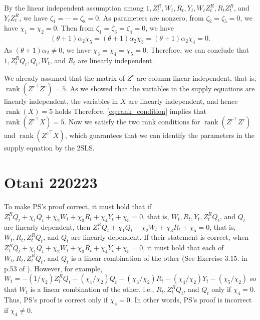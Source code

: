 \documentclass[11pt, a4paper]{article}
\DeclareMathOperator{\rank}{rank}
\begin{document}
By the linear independent assumption among $1, Z^R_t, W_t, R_t, Y_t, W_tZ^R_t, R_tZ^R_t$, and $Y_tZ^R_t$, we have $\zeta_1 = \cdots = \zeta_8 = 0$.
As parameters are nonzero, from $\zeta_2 = \zeta_5 = 0$, we have $\chi_1 = \chi_2 =0$.
Then from $\zeta_1 = \zeta_3 = \zeta_4 = 0$, we have 
\begin{align*}
    (\theta + 1 )\alpha_2\chi_5 = (\theta + 1 )\alpha_2\chi_3 = (\theta + 1 )\alpha_2\chi_4 = 0.
\end{align*}
As $(\theta + 1)\alpha_2 \ne 0$, we have $\chi_3 = \chi_4 = \chi_5 = 0$.
Therefore, we can conclude that $1, Z^R_{t}Q_{t}, Q_{t}, W_{t}$, and $ R_{t}$ are linearly independent.


We already assumed that the matrix of $Z^c$ are column linear independent, that is, $\rank({Z^c}^\top Z^c) = 5$.
As we showed that the variables in the supply equations are linearly independent, the variables in $X$ are linearly independent, and hence $\rank(X) = 5$ holds
Therefore, \eqref{eq:rank_condition} implies that $\rank({Z^c}^\top X) = 5$.
Now we satisfy the two rank conditions for $\rank({Z^c}^\top Z^c)$ and $\rank({Z^c}^\top X)$, which guarantees that we can identify the parameters in the supply equation by the 2SLS.


\section{Otani 220223}

To make PS's proof correct, it must hold that if $Z^{R}_{t} Q_{t} + \chi_1 Q_{t} + \chi_2 W_{t} + \chi_3 R_{t} + \chi_4 Y_{t} + \chi_5 = 0$, that is, $W_{t}, R_{t}, Y_{t}, Z^{R}_{t}Q_{t}$, and $Q_{t}$ are linearly dependent, then $Z^{R}_{t} Q_{t} + \chi_1 Q_{t} + \chi_2 W_{t} + \chi_3 R_{t} + \chi_5 = 0$, that is, $W_{t}, R_{t}, Z^{R}_{t}Q_{t}$, and $Q_{t}$ are linearly dependent. If their statement is correct, when $Z^{R}_{t} Q_{t} + \chi_1 Q_{t} + \chi_2 W_{t} + \chi_3 R_{t} + \chi_4 Y_{t} + \chi_5 = 0$, it must hold that each of $W_{t}, R_{t}, Z^{R}_{t}Q_{t}$, and $Q_{t}$ is a linear combination of the other (See Exercise 3.15. in p.53 of \cite{abadir2005matrix}). However, for example, $W_{t}=-(1/\chi_2) Z^{R}_{t} Q_{t} - (\chi_1/\chi_2)  Q_{t} - (\chi_3/\chi_2) R_{t} - (\chi_4/\chi_2) Y_{t} - (\chi_5/\chi_2)$ so that $W_{t}$ is a linear combination of the other, i.e., $R_{t}, Z^{R}_{t}Q_{t}$, and $Q_{t}$ only if $\chi_4=0$. Thus, PS's proof is correct only if $\chi_4=0$. In other words, PS's proof is incorrect if $\chi_4\neq 0$.
\end{document}

